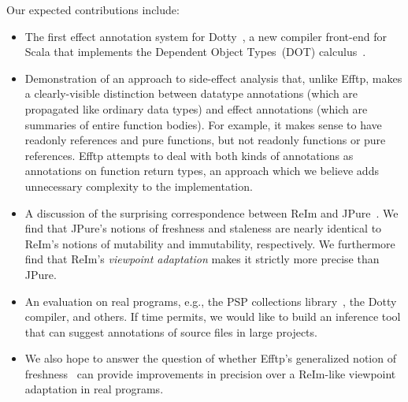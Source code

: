 \documentclass[letterpaper,11pt]{article}
\begin{document}


\begin{comment}
Reference immutability is a form of ??deep ownership
where mutations of shared state cannot be performed through any access path
that contains a \emph{read-only reference}.
\emph{ReIm~\cite{reim}} implements a reference immutability system for Java.
A ReIm-like system may also work well for Scala code,
but Scala introduces a variety of language constructs that make it difficult to
see clearly whether a ReIm-like system would work well for Scala.
\end{comment}

Our expected contributions include:
\begin{itemize}
\item The first effect annotation system for Dotty~\cite{dotty},
	a new compiler front-end for Scala that
	implements the Dependent Object Types~(DOT) calculus~\cite{dot-calculus}.

\item Demonstration of an approach to side-effect analysis
	that, unlike Efftp, makes a clearly-visible distinction between datatype annotations
	(which are propagated like ordinary data types) and
	effect annotations (which are summaries of entire function bodies).
	For example, it makes sense to have readonly references and pure functions,
	but not readonly functions or pure references.
	Efftp attempts to deal with both kinds of annotations as annotations
	on function return types, an approach which we believe adds unnecessary complexity
	to the implementation.

\item A discussion of the surprising correspondence between ReIm and JPure~\cite{jpure}.
	We find that JPure's notions of freshness and staleness are nearly identical to
	ReIm's notions of mutability and immutability, respectively.
	We furthermore find that ReIm's \emph{viewpoint adaptation} makes
	it strictly more precise than JPure.

\item An evaluation on real programs, e.g., the PSP collections library~\cite{psp-page},
	the Dotty compiler, and others.
	If time permits, we would like to build an inference tool that can suggest annotations
	of source files in large projects.

\item We also hope to answer the question of whether Efftp's generalized notion
	of freshness~\cite{efftp} can provide improvements in precision
	over a ReIm-like viewpoint adaptation in real programs.
	
\end{itemize}

%
%


\end{document}
